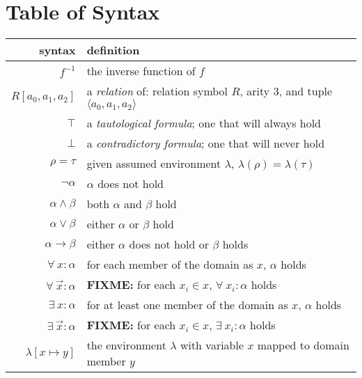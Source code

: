 \section{Table of Syntax}
	\begin{tabular}{|r|l|}
		\hline
		\textbf{syntax}                  &  \textbf{definition}                                                     \\
		\hline
		$f^{-1}$                         &  the inverse function of $f$                                             \\
		\hline
		$R[a_0,a_1,a_2]$                 &  a \emph{relation} of: relation symbol $R$, arity $3$, and tuple $\langle a_0,a_1,a_2 \rangle$  \\
		$\top$                           &  a \emph{tautological formula}; one that will always hold                \\
		$\bot$                           &  a \emph{contradictory formula}; one that will never hold                \\
		$\rho = \tau$                    &  given assumed environment $\lambda$, $\lambda(\rho) = \lambda(\tau)$    \\
		$\neg \alpha$                    &  $\alpha$ does not hold                                                  \\
		$\alpha \wedge \beta$            &  both $\alpha$ and $\beta$ hold                                          \\
		$\alpha \vee \beta$              &  either $\alpha$ or $\beta$ hold                                         \\
		$\alpha \to \beta$               &  either $\alpha$ does not hold or $\beta$ holds                          \\
		$\forall\ x : \alpha$            &  for each member of the domain as $x$, $\alpha$ holds                    \\
		$\forall\ \vec{x} : \alpha$      &  \textbf{FIXME:} for each $x_i \in x$, $\forall\ x_i : \alpha$ holds     \\
		$\exists\ x : \alpha$            &  for at least one member of the domain as $x$, $\alpha$ holds            \\
		$\exists\ \vec{x} : \alpha$      &  \textbf{FIXME:} for each $x_i \in x$, $\exists\ x_i : \alpha$ holds     \\
		\hline
		$\lambda[x \mapsto y]$           &  the environment $\lambda$ with variable $x$ mapped to domain member $y$ \\

\end{tabular}
